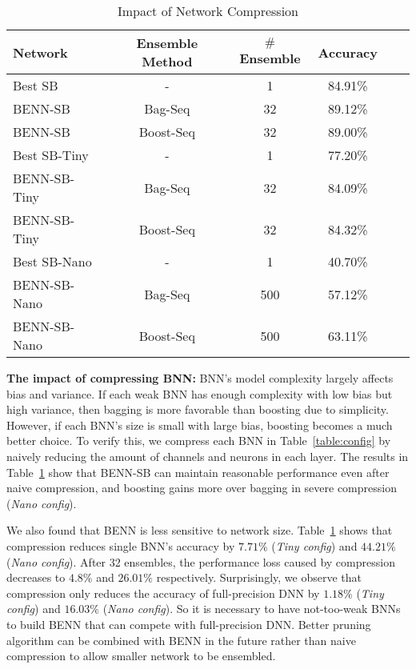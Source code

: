 \documentclass[10pt,twocolumn,letterpaper]{article}
\begin{document}
\begin{table}
    \vspace{-1mm}
    \caption{Impact of Network Compression}
    \centering
    \scriptsize
    \begin{tabular}{lccccc}
        \toprule
        \toprule
        Network & Ensemble Method & $\#$Ensemble & Accuracy\\
        \midrule
        Best SB & - & 1 & 84.91\%\\
        BENN-SB & Bag-Seq & 32 & 89.12\%\\
        BENN-SB & Boost-Seq & 32 & 89.00\%\\
        \hline
        Best SB-Tiny & - & 1 & 77.20\%\\
        BENN-SB-Tiny & Bag-Seq & 32 & 84.09\%\\
        BENN-SB-Tiny & Boost-Seq & 32 & 84.32\%\\
        \hline
        Best SB-Nano & - & 1 & 40.70\%\\
        BENN-SB-Nano & Bag-Seq & 500 & 57.12\%\\
        BENN-SB-Nano & Boost-Seq & 500 & 63.11\%\\
        \hline
        \bottomrule
    \end{tabular}
    \label{table:compression}
    \vspace{-3mm}
\end{table}

\textbf{The impact of compressing BNN: } BNN's model complexity largely affects bias and variance. If each weak BNN has enough complexity with low bias but high variance, then bagging is more favorable than boosting due to simplicity. However, if each BNN's size is small with large bias, boosting becomes a much better choice. To verify this, we compress each BNN in Table~\ref{table:config} by naively reducing the amount of channels and neurons in each layer. The results in Table~\ref{table:compression} show that BENN-SB can maintain reasonable performance even after naive compression, and boosting gains more over bagging in severe compression (\textit{Nano config}). 

We also found that BENN is less sensitive to network size. Table~\ref{table:compression} shows that compression reduces single BNN's accuracy by $7.71\%$ (\textit{Tiny config}) and $44.21\%$ (\textit{Nano config}). After 32 ensembles, the performance loss caused by compression decreases to $4.8\%$ and $26.01\%$ respectively. Surprisingly, we observe that compression only reduces the accuracy of full-precision DNN by $1.18\%$ (\textit{Tiny config}) and $16.03\%$ (\textit{Nano config}). So it is necessary to have not-too-weak BNNs to build BENN that can compete with full-precision DNN. Better pruning algorithm can be combined with BENN in the future rather than naive compression to allow smaller network to be ensembled.
\end{document}

